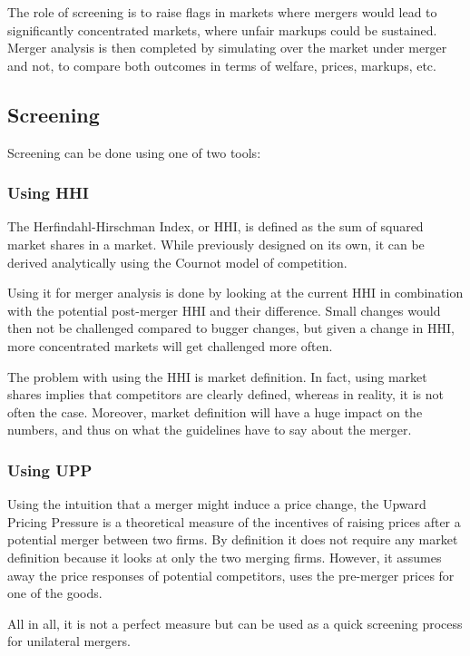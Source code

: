 The role of screening is to raise flags in markets where mergers would lead to significantly concentrated markets, where unfair markups could be sustained. Merger analysis is then completed by simulating over the market under merger and not, to compare both outcomes in terms of welfare, prices, markups, etc.

\subsection{Screening}

Screening can be done using one of two tools:

\subsubsection{Using HHI}

The Herfindahl-Hirschman Index, or HHI, is defined as the sum of squared market shares in a market. While previously designed on its own, it can be derived analytically using the Cournot model of competition.

Using it for merger analysis is done by looking at the current HHI in combination with the potential post-merger HHI and their difference. Small changes would then not be challenged compared to bugger changes, but given a change in HHI, more concentrated markets will get challenged more often.

The problem with using the HHI is market definition. In fact, using market shares implies that competitors are clearly defined, whereas in reality, it is not often the case. Moreover, market definition will have a huge impact on the numbers, and thus on what the guidelines have to say about the merger.

\subsubsection{Using UPP}

Using the intuition that a merger might induce a price change, the Upward Pricing Pressure is a theoretical measure of the incentives of raising prices after a potential merger between two firms. By definition it does not require any market definition because it looks at only the two merging firms. However, it assumes away the price responses of potential competitors, uses the pre-merger prices for one of the goods. 

All in all, it is not a perfect measure but can be used as a quick screening process for unilateral mergers.

